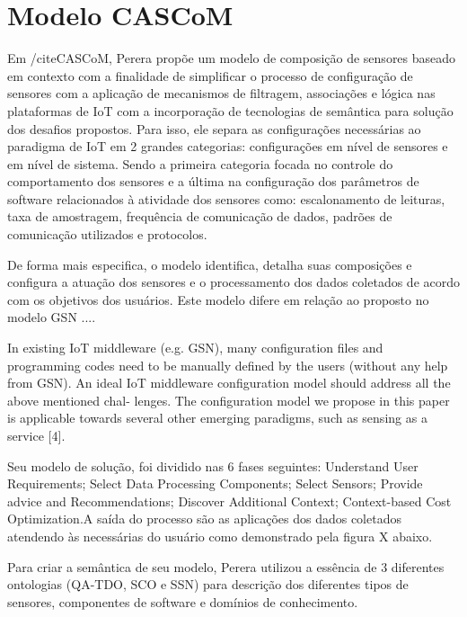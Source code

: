 \section{Modelo CASCoM}
Em /cite{CASCoM}, Perera propõe um modelo de composição de sensores baseado em contexto com a finalidade de simplificar o processo de configuração de sensores com a aplicação de mecanismos de filtragem, associações e lógica nas plataformas de IoT com a incorporação de tecnologias de semântica para solução dos desafios propostos.
Para isso, ele separa as configurações necessárias ao paradigma de IoT em 2 grandes categorias: configurações em nível de sensores e em nível de sistema. Sendo a primeira categoria focada no controle do comportamento dos sensores e a última na configuração dos parâmetros de software relacionados à atividade dos sensores como: escalonamento de leituras, taxa de amostragem, frequência de comunicação de dados, padrões de comunicação utilizados e protocolos.

De forma mais especifica, o modelo identifica, detalha suas composições e configura a atuação dos sensores e o processamento dos dados coletados de acordo com os objetivos dos usuários.
Este modelo difere em relação ao proposto no modelo GSN ....

In existing IoT middleware (e.g. GSN), many configuration files and programming codes need to be manually defined by the users (without any help from GSN). An ideal IoT middleware configuration model should address all the above mentioned chal- lenges. The configuration model we propose in this paper is applicable towards several other emerging paradigms, such as sensing as a service [4]. 




Seu modelo de solução, foi dividido nas 6 fases seguintes: Understand User Requirements; Select Data Processing Components; Select Sensors; Provide advice and Recommendations; Discover Additional Context; Context-based Cost Optimization.A saída do processo são as aplicações dos dados coletados atendendo às necessárias do usuário como demonstrado pela figura X abaixo.


Para criar a semântica de seu modelo, Perera utilizou a essência de 3 diferentes ontologias (QA-TDO, SCO e SSN) para descrição dos diferentes tipos de sensores, componentes de software e domínios de conhecimento.

